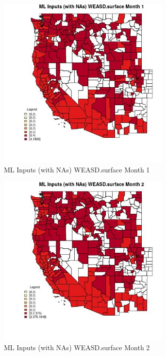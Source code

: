 \begin{figure} 
\centering  
\includegraphics[width=0.77\textwidth]{Code_Outputs/Report_ML_input_PM25_Step4_part_e_de_duplicated_aves_compiled_2019-05-21wNAs_CountyWEASDsurfacemedianMonth1.jpg} 
\caption{\label{fig:Report_ML_input_PM25_Step4_part_e_de_duplicated_aves_compiled_2019-05-21wNAsCountyWEASDsurfacemedianMonth1}ML Inputs (with NAs) WEASD.surface Month 1} 
\end{figure} 
 

\begin{figure} 
\centering  
\includegraphics[width=0.77\textwidth]{Code_Outputs/Report_ML_input_PM25_Step4_part_e_de_duplicated_aves_compiled_2019-05-21wNAs_CountyWEASDsurfacemedianMonth2.jpg} 
\caption{\label{fig:Report_ML_input_PM25_Step4_part_e_de_duplicated_aves_compiled_2019-05-21wNAsCountyWEASDsurfacemedianMonth2}ML Inputs (with NAs) WEASD.surface Month 2} 
\end{figure} 
 

